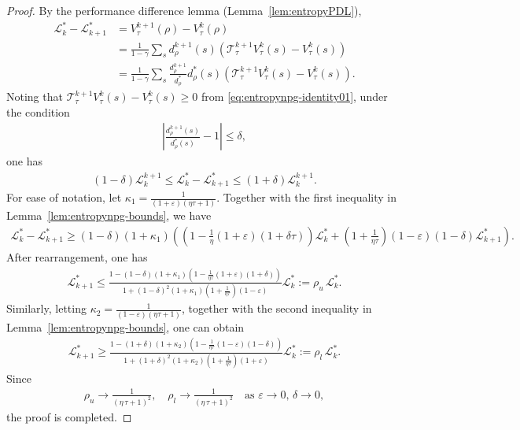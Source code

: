 \begin{proof}
    By the performance difference lemma (Lemma~\ref{lem:entropyPDL}),
\begin{align*}
    \mathcal{L}_k^*-\mathcal{L}_{k+1}^*&=V_\tau^{k+1}(\rho)-V_\tau^k(\rho)\\
    &=\frac{1}{1-\gamma} \sum_sd_\rho^{k+1}(s)\left(\mathcal{T}_\tau^{k+1}V_\tau^{k}(s)-V_\tau^{k}(s)\right)\\
    &=\frac{1}{1-\gamma} \sum_s\frac{d_\rho^{k+1}}{d_\rho^*}d_\rho^*(s)\left(\mathcal{T}_\tau^{k+1}V_\tau^{k}(s)-V_\tau^{k}(s)\right).
\end{align*}
Noting that $\mathcal{T}_\tau^{k+1}V_\tau^{k}(s)-V_\tau^{k}(s)\geq 0$ from \eqref{eq:entropynpg-identity01}, under the condition
\begin{align*}
\left|\frac{d_\rho^{k+1}(s)}{d_\rho^*(s)}-1\right|\leq\delta,
\end{align*}
one has
\begin{align*}
   (1-\delta)\mathcal{L}_k^{k+1} \leq \mathcal{L}_k^*-\mathcal{L}_{k+1}^*\leq (1+\delta)\mathcal{L}_k^{k+1}.
\end{align*}
For ease of notation, let $\kappa_1 = \frac{1}{(1+\varepsilon)(\eta\tau+1)}$. Together with the first inequality in Lemma~\ref{lem:entropynpg-bounds}, we have 
\begin{align*}
\mathcal{L}_k^*-\mathcal{L}_{k+1}^*\geq (1-\delta)(1+\kappa_1)\left(\left(1-\frac{1}{\eta}(1+\varepsilon)(1+\delta\tau)\right)\mathcal{L}_k^*+\left(1+\frac{1}{\eta\tau}\right)(1-\varepsilon)(1-\delta)\mathcal{L}_{k+1}^*\right).
\end{align*}
After rearrangement, one has
\begin{align*}
\mathcal{L}_{k+1}^*\leq \frac{1-(1-\delta)(1+\kappa_1)\left(1-\frac{1}{\eta\tau}(1+\varepsilon)(1+\delta)\right)}{1+(1-\delta)^2(1+\kappa_1)\left(1+\frac{1}{\eta\tau}\right)(1-\varepsilon)}\mathcal{L}_k^*:=\rho_u\,\mathcal{L}_k^*.
\end{align*}
Similarly, letting $\kappa_2=\frac{1}{(1-\varepsilon)(\eta\tau+1)}$, together with the second inequality in Lemma~\ref{lem:entropynpg-bounds}, one can obtain 
\begin{align*}
\mathcal{L}_{k+1}^*\geq \frac{1-(1+\delta)(1+\kappa_2)
\left(1-\frac{1}{\eta\tau}(1-\varepsilon)(1-\delta)\right)}{1+(1+\delta)^2(1+\kappa_2)\left(1+\frac{1}{\eta\tau}\right)(1+\varepsilon)}\mathcal{L}_k^*:=\rho_l\,\mathcal{L}_k^*.
\end{align*}
Since 
\begin{align*}
\rho_u\rightarrow \frac{1}{(\eta\,\tau+1)^2},\quad 
\rho_l\rightarrow \frac{1}{(\eta\,\tau+1)^2}\quad \mbox{as }\varepsilon\rightarrow 0, \,\delta\rightarrow 0,
\end{align*}
the proof is completed.
\end{proof}





